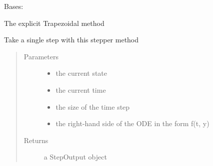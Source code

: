 \documentclass[letterpaper,10pt,english]{sphinxmanual}
\begin{document}

\begin{fulllineitems}
\label{\detokenize{spitfire.time.methods:spitfire.time.methods.ExplicitRungeKutta2Trapezoid}}
Bases: {\hyperref[\detokenize{spitfire.time.methods:spitfire.time.methods.ExplicitRungeKutta}]{}}

The explicit Trapezoidal method

\begin{fulllineitems}
\label{\detokenize{spitfire.time.methods:spitfire.time.methods.ExplicitRungeKutta2Trapezoid.single_step}}
Take a single step with this stepper method
\begin{quote}\begin{description}
\item[{Parameters}] \leavevmode\begin{itemize}
\item {} 
 \textendash{} the current state

\item {} 
 \textendash{} the current time

\item {} 
 \textendash{} the size of the time step

\item {} 
 \textendash{} the right-hand side of the ODE in the form f(t, y)

\end{itemize}

\item[{Returns}] \leavevmode
a StepOutput object

\end{description}\end{quote}

\end{fulllineitems}


\end{fulllineitems}
\end{document}
